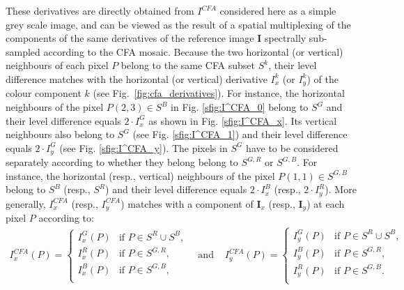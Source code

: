 \documentclass[twoside]{article}
\begin{document}
\noindent These derivatives are directly obtained from $I^{CFA}$ considered here as a simple grey scale image, and can be viewed as the result of a spatial multiplexing of the components of the same derivatives of the reference image $\mathbf{I}$ spectrally sub-sampled according to the CFA mosaic.
Because the two horizontal (or vertical) neighbours of each pixel $P$ belong to the same CFA subset $S^k$, their level difference matches with the horizontal (or vertical) derivative $I^k_x$ (or $I^k_y$) of the colour component $k$ (see Fig.~\ref{fig:cfa_derivatives}). For instance, the horizontal neighbours of the pixel $P(2,3) \in S^B$ in Fig. \ref{sfig:I^CFA_0} belong to $S^G$ and their level difference equals $2 \cdot I^G_x$ as shown in Fig. \ref{sfig:I^CFA_x}. Its vertical neighbours also belong to $S^G$ (see Fig. \ref{sfig:I^CFA_1}) and their level difference equals $2 \cdot I^G_y$ (see Fig. \ref{sfig:I^CFA_y}). The pixels in $S^G$ have to be considered separately according to whether they belong belong to $S^{G,R}$ or $S^{G,B}$. For instance, the horizontal (resp., vertical) neighbours of the pixel $P(1,1) \in S^{G,B}$ belong to $S^B$ (resp., $S^R$) and their level difference equals  $2 \cdot I^B_x$ (resp.,  $2 \cdot I^R_y$). More generally, $I^{CFA}_x$ (resp., $I^{CFA}_y$) matches with a component of $\mathbf{I}_x$ (resp., $\mathbf{I}_y$) at each pixel $P$ according to:
\begin{equation}
	\begin{array}{lcl}
		I^{CFA}_x(P) = \left\lbrace
		\begin{array}{cl}
			I^G_x(P)  & \text{if $P \in S^R \cup S^B$,}\\ 
			I^R_x(P)  & \text{if $P \in S^{G,R}$,} \\
			I^B_x(P)  & \text{if $P \in S^{G,B}$,}\\
		\end{array}\right.
		& \text{ and } &
		I^{CFA}_y(P) = \left\lbrace
		\begin{array}{cl}
			I^G_y(P)  & \text{if $P \in S^R \cup S^B$,}\\ 
			I^B_y(P)  & \text{if $P \in S^{G,R}$,} \\
			I^R_y(P)  & \text{if $P \in S^{G,B}$.}\\
		\end{array}\right.
	\end{array}
	\label{eq:cfa_derivatives}
\end{equation}
\end{document}
